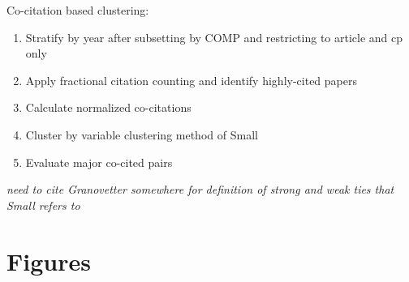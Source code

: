 Co-citation based clustering:
\begin{enumerate}
\item Stratify by year after subsetting by COMP and restricting to article and cp only
\item Apply fractional citation counting and identify highly-cited papers
\item Calculate normalized co-citations
\item Cluster by variable clustering method of Small
\item Evaluate major co-cited pairs
\end{enumerate}

\emph{need to cite Granovetter somewhere for definition of strong and weak ties that Small refers to}
\clearpage

\section*{Figures}

